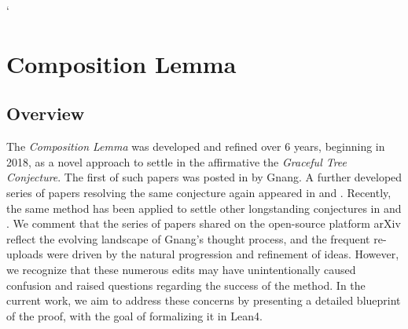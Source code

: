 `%
%

\chapter{\texorpdfstring{Composition Lemma}{Composition Lemma}}

\section{Overview}
The \textit{Composition Lemma} was developed and refined over 6 years, beginning in 2018, as a novel approach to settle in the affirmative the \textit{Graceful Tree Conjecture}. The first of such papers was posted in \cite{gnang2020gracefullabelingstrees} by Gnang. A further developed series of papers resolving the same conjecture again appeared in \cite{gnang2022compositionlemma} and \cite{gnang2023proofkotzigringelrosaconjecture}. Recently, the same method has been applied to settle other longstanding conjectures in \cite{chalise2024treenedgesdecomposes} and \cite{chalise2024prooftreepackingconjecture}. We comment that the series of papers shared on the open-source platform arXiv reflect the evolving landscape of Gnang's thought process, and the frequent re-uploads were driven by the natural progression and refinement of ideas. However, we recognize that these numerous edits may have unintentionally caused confusion and raised questions regarding the success of the method. In the current work, we aim to address these concerns by presenting a detailed blueprint of the proof, with the goal of formalizing it in Lean4.



